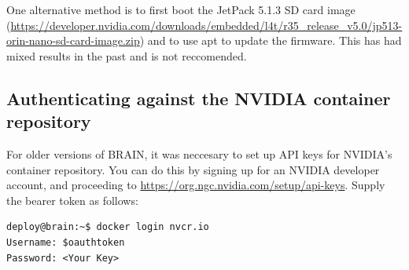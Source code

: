 \documentclass[11pt]{article}
\begin{document}
One alternative method is to first boot the JetPack 5.1.3 SD card image (\href{https://developer.nvidia.com/downloads/embedded/l4t/r35_release_v5.0/jp513-orin-nano-sd-card-image.zip}{https://developer.nvidia.com/downloads/embedded/l4t/r35\_release\_v5.0/jp513-orin-nano-sd-card-image.zip}) and to use apt to update the firmware. This has had mixed results in the past and is not reccomended.

\subsection{Authenticating against the NVIDIA container repository}

For older versions of BRAIN, it was neccesary to set up API keys for NVIDIA's container repository. You can do this by signing up for an NVIDIA developer account, and proceeding to \href{https://org.ngc.nvidia.com/setup/api-keys}{https://org.ngc.nvidia.com/setup/api-keys}. Supply the bearer token as follows:

\lstset{style=console}
\begin{lstlisting}
deploy@brain:~$ docker login nvcr.io
Username: $oauthtoken
Password: <Your Key>
\end{lstlisting}

\printbibliography
\end{document}

